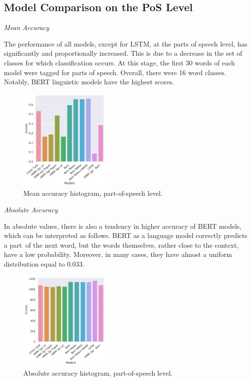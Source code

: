 \documentclass[a4paper]{article}
\newcommand{\head}[1]{\vspace{0.5em}\emph{#1}\vspace{0.25em}}
\begin{document}
\subsection{Model Comparison on the PoS Level}

\head{Mean Accuracy}

The performance of all models, except for LSTM, at the parts of speech level, has significantly and proportionally increased. This is due to a decrease in the set of classes for which classification occurs. At this stage, the first 30 words of each model were tagged for parts of speech. Overall, there were 16 word classes. Notably, BERT linguistic models have the highest scores.

\begin{figure}
\caption{Mean accuracy histogram, part-of-speech level.}
\label{fig:mean-accuracy-hist-pos}
\centering
\includegraphics[width=0.4\textwidth]{figures/pdf/mean-accuracy-hist-pos.pdf}
\end{figure}

\head{Absolute Accuracy}

In absolute values, there is also a tendency in higher accuracy of BERT models, which can be interpreted as follows. BERT as a language model correctly predicts a part of the next word, but the words themselves, rather close to the context, have a low probability. Moreover, in many cases, they have almost a uniform distribution equal to 0.033.

\begin{figure}
\caption{Absolute accuracy histogram, part-of-speech level.}
\label{fig:abs-accuracy-hist-pos}
\centering
\includegraphics[width=0.4\textwidth]{figures/pdf/abs-accuracy-hist-pos.pdf}
\end{figure}
\end{document}
